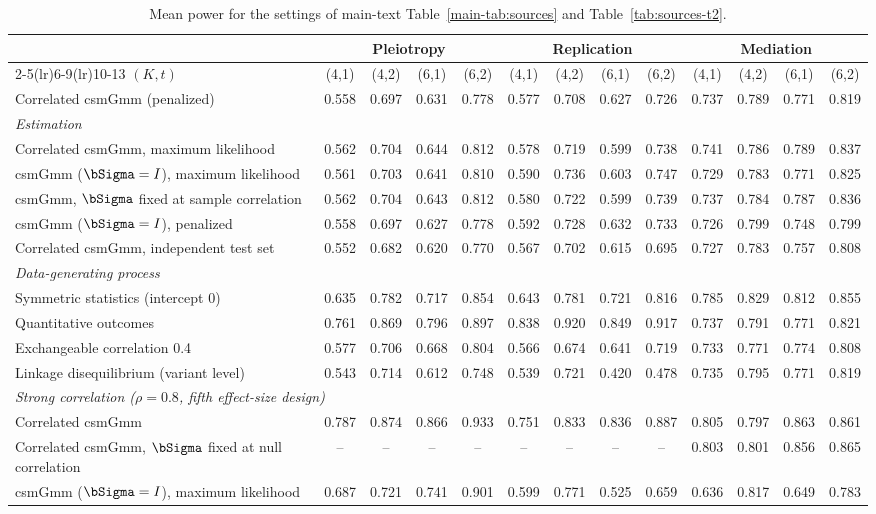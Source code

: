 {\footnotesize
\begin{longtable}{l cccc cccc cccc}
\caption{Mean power for the settings of main-text Table~\ref{main-tab:sources} and Table~\ref{tab:sources-t2}.}\label{tab:sources-power}\\
\toprule
 & \multicolumn{4}{c}{Pleiotropy} & \multicolumn{4}{c}{Replication} & \multicolumn{4}{c}{Mediation}\\
\cmidrule(lr){2-5}\cmidrule(lr){6-9}\cmidrule(lr){10-13}
$(K,t)$ & (4,1) & (4,2) & (6,1) & (6,2) & (4,1) & (4,2) & (6,1) & (6,2) & (4,1) & (4,2) & (6,1) & (6,2)\\
\midrule
\endfirsthead
\bottomrule
\endfoot
Correlated csmGmm (penalized) & 0.558 & 0.697 & 0.631 & 0.778 & 0.577 & 0.708 & 0.627 & 0.726 & 0.737 & 0.789 & 0.771 & 0.819\\
\multicolumn{13}{l}{\textit{Estimation}}\\
Correlated csmGmm, maximum likelihood & 0.562 & 0.704 & 0.644 & 0.812 & 0.578 & 0.719 & 0.599 & 0.738 & 0.741 & 0.786 & 0.789 & 0.837\\
csmGmm ($\bSigma=I$), maximum likelihood & 0.561 & 0.703 & 0.641 & 0.810 & 0.590 & 0.736 & 0.603 & 0.747 & 0.729 & 0.783 & 0.771 & 0.825\\
csmGmm, $\bSigma$ fixed at sample correlation & 0.562 & 0.704 & 0.643 & 0.812 & 0.580 & 0.722 & 0.599 & 0.739 & 0.737 & 0.784 & 0.787 & 0.836\\
csmGmm ($\bSigma=I$), penalized & 0.558 & 0.697 & 0.627 & 0.778 & 0.592 & 0.728 & 0.632 & 0.733 & 0.726 & 0.799 & 0.748 & 0.799\\
Correlated csmGmm, independent test set & 0.552 & 0.682 & 0.620 & 0.770 & 0.567 & 0.702 & 0.615 & 0.695 & 0.727 & 0.783 & 0.757 & 0.808\\
\multicolumn{13}{l}{\textit{Data-generating process}}\\
Symmetric statistics (intercept 0) & 0.635 & 0.782 & 0.717 & 0.854 & 0.643 & 0.781 & 0.721 & 0.816 & 0.785 & 0.829 & 0.812 & 0.855\\
Quantitative outcomes & 0.761 & 0.869 & 0.796 & 0.897 & 0.838 & 0.920 & 0.849 & 0.917 & 0.737 & 0.791 & 0.771 & 0.821\\
Exchangeable correlation 0.4 & 0.577 & 0.706 & 0.668 & 0.804 & 0.566 & 0.674 & 0.641 & 0.719 & 0.733 & 0.771 & 0.774 & 0.808\\
Linkage disequilibrium (variant level) & 0.543 & 0.714 & 0.612 & 0.748 & 0.539 & 0.721 & 0.420 & 0.478 & 0.735 & 0.795 & 0.771 & 0.819\\
\multicolumn{13}{l}{\textit{Strong correlation ($\rho=0.8$, fifth effect-size design)}}\\
Correlated csmGmm & 0.787 & 0.874 & 0.866 & 0.933 & 0.751 & 0.833 & 0.836 & 0.887 & 0.805 & 0.797 & 0.863 & 0.861\\
Correlated csmGmm, $\bSigma$ fixed at null correlation & -- & -- & -- & -- & -- & -- & -- & -- & 0.803 & 0.801 & 0.856 & 0.865\\
csmGmm ($\bSigma=I$), maximum likelihood & 0.687 & 0.721 & 0.741 & 0.901 & 0.599 & 0.771 & 0.525 & 0.659 & 0.636 & 0.817 & 0.649 & 0.783\\
\end{longtable}}
